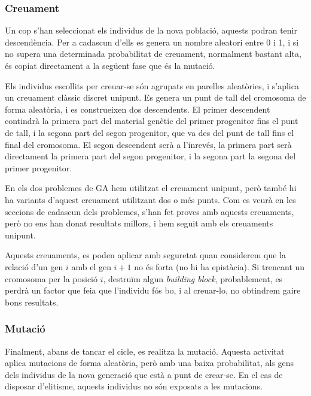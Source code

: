 
\subsubsection{Creuament}

Un cop s'han seleccionat els individus de la nova població, aquests podran tenir
descendència. Per a cadascun d'ells es genera un nombre aleatori entre 0 i 1, i
si no supera una determinada probabilitat de creuament, normalment bastant alta,
és copiat directament a la següent fase que és la mutació.

Els individus escollits per creuar-se són agrupats en parelles aleatòries, i
s'aplica un creuament clàssic discret unipunt.  Es genera un punt de tall del
cromosoma de forma aleatòria, i es construeixen dos descendents. El primer
descendent contindrà la primera part del material genètic del primer progenitor
fins el punt de tall, i la segona part del segon progenitor, que va des del punt
de tall fins el final del cromosoma. El segon descendent serà a l'inrevés, la
primera part serà directament la primera part del segon progenitor, i la segona
part la segona del primer progenitor.

En els dos problemes de GA hem utilitzat el creuament unipunt, però també hi
ha variants d'aquest creuament utilitzant dos o més punts.  Com es veurà en les
seccions de cadascun dels problemes, s'han fet proves amb aquests creuaments,
però no ens han donat resultats millors, i hem seguit amb els creuaments
unipunt.

Aquests creuaments, es poden aplicar amb seguretat quan considerem que la
relació d'un gen $i$ amb el gen $i+1$ no és forta (no hi ha epistàcia).  Si
trencant un cromosoma per la posició $i$, destruïm algun \emph{building block},
probablement, es perdrà un factor que feia que l'individu fós bo, i al
creuar-lo, no obtindrem gaire bons resultats.

\subsubsection{Mutació}

Finalment, abans de tancar el cicle, es realitza la mutació. Aquesta activitat
aplica mutacions de forma aleatòria, però amb una baixa probabilitat, als gens
dels individus de la nova generació que està a punt de crear-se. En el cas de
disposar d'elitisme, aquests individus no són exposats a les mutacions.

